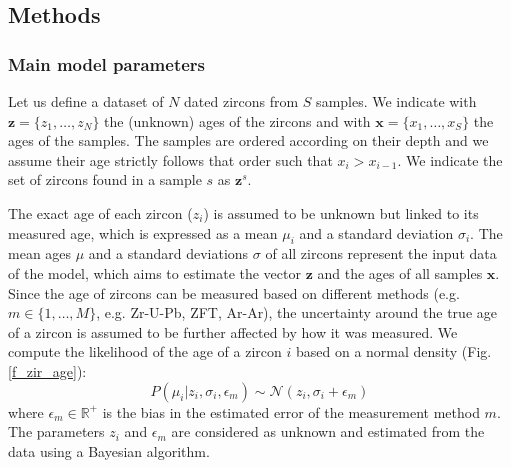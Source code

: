 \documentclass[12pt,letterpaper]{article}
\begin{document}
\begin{flushright}
\end{flushright}
\bigskip
\noindent 

\bigskip
\medskip
\begin{center}

\end{center}

\vspace{1.5in}
\linenumbers
\subsection{Methods}
\subsubsection{Main model parameters}
Let us define a dataset of $N$ dated zircons from $S$ samples. We indicate with $\mathbf{z} = \{z_1, \dots, z_N\}$ the (unknown) ages of the zircons and with $\mathbf{x} = \{x_1, \dots, x_S\}$ the ages of the samples.
The samples are ordered according on their depth and we assume their age strictly follows that order such that $x_{i} > x_{i - 1}$. 
We indicate the set of zircons found in a sample $s$ as $\mathbf{z}^s$.

The exact age of each zircon ($z_i$) is assumed to be unknown but linked to its measured age, which is expressed as a mean $\mu_i$ and a standard deviation $\sigma_i$.
The mean ages $\mu$ and a standard deviations $\sigma$ of all zircons represent the input data of the model, which aims to estimate the vector $\mathbf{z}$ and the ages of all samples $\mathbf{x}$. 
Since the age of zircons can be measured based on different methods (e.g. $m \in \{1, \dots, M \}$, e.g. Zr-U-Pb, ZFT, Ar-Ar), the uncertainty around the true age of a zircon is assumed to be further affected by how it was measured. We compute the likelihood of the age of a zircon $i$ based on a normal density (Fig. \ref{f_zir_age}):
\begin{equation}
P(\mu_i | z_i, \sigma_i, \epsilon_m) \sim \mathcal{N}(z_i, \sigma_i + \epsilon_m)   
\end{equation}
where 
 $\epsilon_m \in \mathbb{R^+}$ is the bias in the estimated error of the measurement method $m$.
The parameters  $z_i$ and $\epsilon_m$ are considered as unknown and estimated from the data using a Bayesian algorithm.
\end{document}
